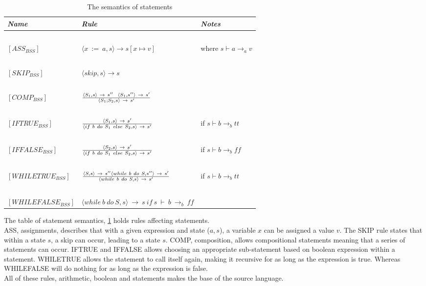 \begin{table}[H]
	\begin{tabular}{|l|l|l|}
	\hline
	\emph{Name}			& \emph{Rule}																															& \emph{Notes} \\ \hline
			~			&															~																			& ~ \\
	$[ASS_{BSS}]$		& $\langle x~:=~a,s \rangle \rightarrow s[x \mapsto v]$																					& where $s \vdash a \rightarrow_{a} v$ \\
			~			&															~																			& ~ \\
	$[SKIP_{BSS}]$		& $\langle skip, s \rangle \rightarrow s$																								& ~ \\
			~			&															~																			& ~ \\
	$[COMP_{BSS}]$		& $\langle S_{1},s \rangle~\rightarrow~s''~~\langle S_{1},s'' \rangle~\rightarrow~s'  \over \langle S_{1};S_{2},s \rangle~\rightarrow~s'$	& ~ \\
			~			&															~																			& ~ \\
	$[IFTRUE_{BSS}]$	& $\langle S_{1},s \rangle~\rightarrow~s' \over \langle if~b~do~S_{1}~else~S_{2},s \rangle~\rightarrow~s'	$							& if $s \vdash b \rightarrow_{b} tt$\\
			~			&															~																			& ~ \\
	$[IFFALSE_{BSS}]$	& $\langle S_{2},s \rangle~\rightarrow~s' \over \langle if~b~do~S_{1}~else~S_{2},s \rangle~\rightarrow~s'	$							& if $s \vdash b \rightarrow_{b} ff$\\
			~			&															~																			& ~ \\
	$[WHILETRUE_{BSS}]$	& $\langle S,s \rangle~\rightarrow~s'' \langle while~b~do~S,s'' \rangle~\rightarrow~s' \over \langle while~b~do~S,s \rangle~\rightarrow~s'	$ & if $s \vdash b \rightarrow_{b} tt$\\
			~			&															~																			& ~ \\
	$[WHILEFALSE_{BSS}]$& $\langle while~b~do~S,s \rangle~\rightarrow~s~if~s~\vdash~b~\rightarrow_{b}~ff $														& ~ \\
	\hline
	\end{tabular}
	\label{tab:semantics_statements}
	\caption{The semantics of statements}
\end{table}

The table of statement semantics, \ref{tab:semantics_statements} holds rules affecting statements. \\
ASS, assignments, describes that with a given expression and state ($a, s$), a variable $x$ can be assigned a value $v$. The SKIP rule states that within a state $s$, a skip can occur, leading to a state $s$. COMP, composition, allows compositional statements meaning that a series of statements can occur. IFTRUE and IFFALSE allows choosing an appropriate sub-statement based on boolean expression within a statement. WHILETRUE allows the statement to call itself again, making it recursive for as long as the expression is true. Whereas WHILEFALSE will do nothing for as long as the expression is false.\\ 
All of these rules, arithmetic, boolean and statements makes the base of the source language.

